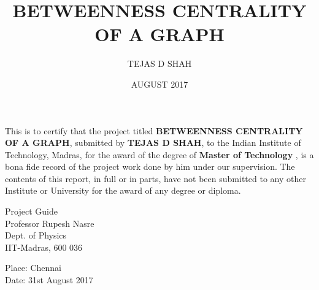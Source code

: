 \documentclass[MTech]{iitmdiss}
\begin{document}

\title{BETWEENNESS CENTRALITY OF A GRAPH}

\author{TEJAS D SHAH}

\date{AUGUST 2017}

\maketitle

\certificate

\vspace*{0.5in}

\noindent This is to certify that the project titled {\bf BETWEENNESS CENTRALITY OF A GRAPH}, submitted by {\bf TEJAS D SHAH}, to the Indian Institute of Technology, Madras, for
the award of the degree of {\bf Master of Technology }, is a bona fide
record of the project work done by him under our supervision.  The
contents of this report, in full or in parts, have not been submitted
to any other Institute or University for the award of any degree or
diploma.

\vspace*{1.5in}

\begin{singlespacing}
\hspace*{-0.25in}
\parbox{2.5in}{
\noindent Project Guide \\ 
\noindent Professor Rupesh Nasre\\
\noindent Dept. of Physics\\
\noindent IIT-Madras, 600 036 \\
} 
\hspace*{1.0in} 
\end{singlespacing}
\vspace*{0.25in}
\noindent Place: Chennai\\
Date: 31st August 2017 


\acknowledgements
\end{document}
